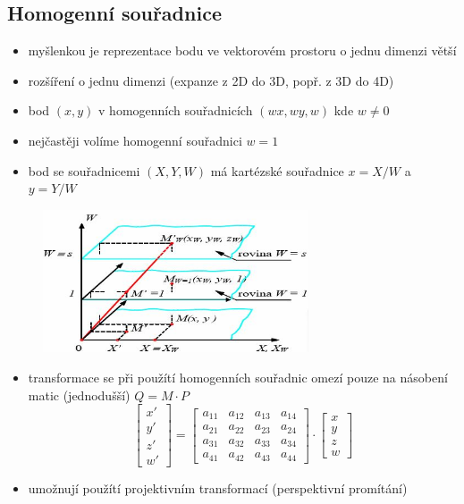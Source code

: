 \subsection{Homogenní souřadnice}
\begin{itemize}
	\item myšlenkou je reprezentace bodu ve vektorovém prostoru o jednu dimenzi větší
	\item rozšíření o jednu dimenzi (expanze z 2D do 3D, popř. z 3D do 4D)
	\item bod $(x,y)$ v homogenních souřadnicích $(wx,wy,w)$ kde $w \not= 0$
	\item nejčastěji volíme homogenní souřadnici $w = 1$
	\item bod se souřadnicemi $(X,Y,W)$ má kartézské souřadnice $x = X/W$ a $y = Y/W$
\end{itemize}
\begin{figure}[H]
\centering
\includegraphics[width=0.7\textwidth]{assets/2_homoprostor}
\end{figure}
\begin{itemize}
	\item transformace se při použítí homogenních souřadnic omezí pouze na násobení matic (jednodušší)  $Q = M \cdot P$
	\begin{equation*}
			 \begin{bmatrix}     
				 x'   \\[0.3em]      
				 y'   \\[0.3em]      
				 z'   \\[0.3em]      
				 w'
		\end{bmatrix} = 
		\begin{bmatrix}
			     a_{11} & a_{12}  & a_{13} & a_{14}     \\[0.3em]
    			 a_{21} & a_{22}  & a_{23} & a_{24}     \\[0.3em]
     			 a_{31} & a_{32}  & a_{33} & a_{34}     \\[0.3em] 
     			 a_{41} & a_{42}  & a_{43} & a_{44}      
		\end{bmatrix} \cdot
		\begin{bmatrix}
			     x     \\[0.3em]
			     y     \\[0.3em]
			     z     \\[0.3em]
			     w        
		\end{bmatrix}
	\end{equation*}
	\item umožnují použítí projektivním transformací (perspektivní promítání)
\end{itemize}
